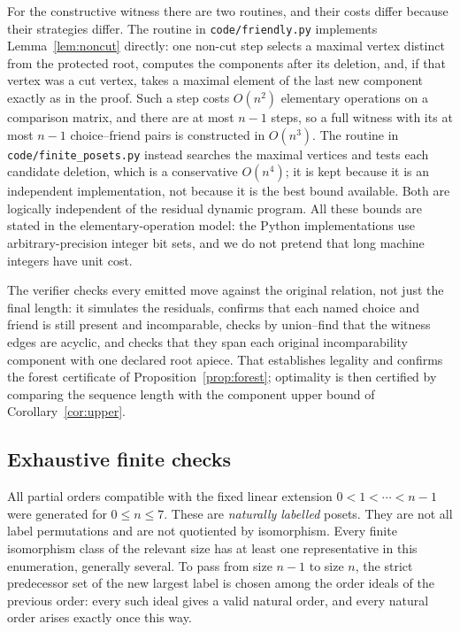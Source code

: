 \documentclass[11pt,letterpaper]{article}
\theoremstyle{definition}
\theoremstyle{remark}
\begin{document}
For the constructive witness there are two routines, and their costs differ
because their strategies differ. The routine in \texttt{code/friendly.py}
implements Lemma~\ref{lem:noncut} directly: one non-cut step selects a
maximal vertex distinct from the protected root, computes the components
after its deletion, and, if that vertex was a cut vertex, takes a maximal
element of the last new component exactly as in the proof. Such a step costs
$O(n^2)$ elementary operations on a comparison matrix, and there are at most
$n-1$ steps, so a full witness with its at most $n-1$ choice--friend pairs
is constructed in $O(n^3)$. The routine in
\texttt{code/finite\_posets.py} instead searches the maximal vertices and
tests each candidate deletion, which is a conservative $O(n^4)$; it is kept
because it is an independent implementation, not because it is the best
bound available. Both are logically independent of the residual dynamic
program. All these bounds are stated in the elementary-operation model: the
Python implementations use arbitrary-precision integer bit sets, and we do
not pretend that long machine integers have unit cost.

The verifier checks every emitted move against the original relation, not
just the final length: it simulates the residuals, confirms that each named
choice and friend is still present and incomparable, checks by union--find
that the witness edges are acyclic, and checks that they span each original
incomparability component with one declared root apiece. That establishes
legality and confirms the forest certificate of
Proposition~\ref{prop:forest}; optimality is then certified by comparing the
sequence length with the component upper bound of
Corollary~\ref{cor:upper}.

\subsection{Exhaustive finite checks}
All partial orders compatible with the fixed linear extension
$0<1<\cdots<n-1$ were generated for $0\le n\le7$. These are
\emph{naturally labelled} posets. They are not all label permutations and
are not quotiented by isomorphism. Every finite isomorphism class of the
relevant size has at least one representative in this enumeration, generally
several. To pass from size $n-1$ to size $n$, the strict predecessor set of
the new largest label is chosen among the order ideals of the previous
order: every such ideal gives a valid natural order, and every natural order
arises exactly once this way.
\end{document}
